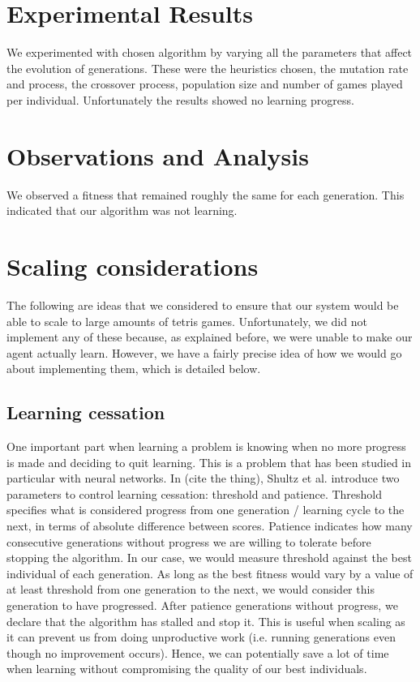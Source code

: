 \documentclass[10pt]{report}
\begin{document}
\section{Experimental Results}
We experimented with chosen algorithm by varying all the parameters that affect the evolution of generations. These were the heuristics chosen, the mutation rate and process, the crossover process, population size and number of games played per individual. Unfortunately the results showed no learning progress.

\section{Observations and Analysis}
We observed a fitness that remained roughly the same for each generation. This indicated that our algorithm was not learning.

\section{Scaling considerations}
The following are ideas that we considered to ensure that our system would be able to scale to large amounts of tetris games. Unfortunately, we did not implement any of these because, as explained before, we were unable to make our agent actually learn. However, we have a fairly precise idea of how we would go about implementing them, which is detailed below.

\subsection{Learning cessation}
One important part when learning a problem is knowing when no more progress is made and deciding to quit learning. This is a problem that has been studied in particular with neural networks. In (cite the thing), Shultz et al. introduce two parameters to control learning cessation: threshold and patience. Threshold specifies what is considered progress from one generation / learning cycle to the next, in terms of absolute difference between scores. Patience indicates how many consecutive generations without progress we are willing to tolerate before stopping the algorithm. In our case, we would measure threshold against the best individual of each generation. As long as the best fitness would vary by a value of at least threshold from one generation to the next, we would consider this generation to have progressed. After patience generations without progress, we declare that the algorithm has stalled and stop it. This is useful when scaling as it can prevent us from doing unproductive work (i.e. running generations even though no improvement occurs). Hence, we can potentially save a lot of time when learning without compromising the quality of our best individuals.
\end{document}

